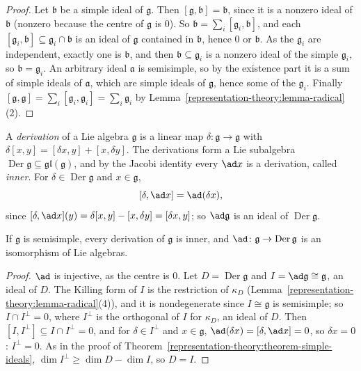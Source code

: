\begin{proof}
Let $\mathfrak{b}$ be a simple ideal of $\mathfrak{g}$. Then $[\mathfrak{g}, \mathfrak{b}] = \mathfrak{b}$, since it is a nonzero ideal of $\mathfrak{b}$ (nonzero because the
centre of $\mathfrak{g}$ is $0$). So $\mathfrak{b} = \sum_i[\mathfrak{g}_i, \mathfrak{b}]$, and each $[\mathfrak{g}_i, \mathfrak{b}] \subseteq \mathfrak{g}_i \cap \mathfrak{b}$ is
an ideal of $\mathfrak{g}$ contained in $\mathfrak{b}$, hence $0$ or $\mathfrak{b}$. As the $\mathfrak{g}_i$ are independent, exactly one is $\mathfrak{b}$, and then
$\mathfrak{b} \subseteq \mathfrak{g}_i$ is a nonzero ideal of the simple $\mathfrak{g}_i$, so $\mathfrak{b} = \mathfrak{g}_i$. An arbitrary ideal $\mathfrak{a}$ is semisimple, so
by the existence part it is a sum of simple ideals of $\mathfrak{a}$, which are simple ideals of $\mathfrak{g}$, hence some of the $\mathfrak{g}_i$. Finally
$[\mathfrak{g}, \mathfrak{g}] = \sum_i[\mathfrak{g}_i, \mathfrak{g}_i] = \sum_i\mathfrak{g}_i$ by Lemma~\ref{representation-theory:lemma-radical}(2).
\end{proof}

A \emph{derivation} of a Lie algebra $\mathfrak{g}$ is a linear map $\delta \colon \mathfrak{g} \to \mathfrak{g}$ with $\delta[x, y] = [\delta x, y] + [x, \delta y]$. The
derivations form a Lie subalgebra $\operatorname{Der}\mathfrak{g} \subseteq \mathfrak{gl}(\mathfrak{g})$, and by the Jacobi identity every $\ad x$ is a derivation, called
\emph{inner}. For $\delta \in \operatorname{Der}\mathfrak{g}$ and $x \in \mathfrak{g}$,
\[
[\delta, \ad x] = \ad(\delta x),
\]
since $[\delta, \ad x](y) = \delta[x, y] - [x, \delta y] = [\delta x, y]$; so $\ad\mathfrak{g}$ is an ideal of $\operatorname{Der}\mathfrak{g}$.

\begin{theorem}\label{representation-theory:theorem-derivations}
If $\mathfrak{g}$ is semisimple, every derivation of $\mathfrak{g}$ is inner, and $\ad \colon \mathfrak{g} \to \operatorname{Der}\mathfrak{g}$ is an isomorphism of Lie algebras.
\end{theorem}

\begin{proof}
$\ad$ is injective, as the centre is $0$. Let $D = \operatorname{Der}\mathfrak{g}$ and $I = \ad\mathfrak{g} \cong \mathfrak{g}$, an ideal of $D$. The Killing form of $I$ is the
restriction of $\kappa_D$ (Lemma~\ref{representation-theory:lemma-radical}(4)), and it is nondegenerate since $I \cong \mathfrak{g}$ is semisimple; so
$I \cap I^\perp = 0$, where $I^\perp$ is the orthogonal of $I$ for $\kappa_D$, an ideal of $D$. Then $[I, I^\perp] \subseteq I \cap I^\perp = 0$, and for $\delta \in I^\perp$
and $x \in \mathfrak{g}$, $\ad(\delta x) = [\delta, \ad x] = 0$, so $\delta x = 0$: $I^\perp = 0$. As in the proof of
Theorem~\ref{representation-theory:theorem-simple-ideals}, $\dim I^\perp \geq \dim D - \dim I$, so $D = I$.
\end{proof}

